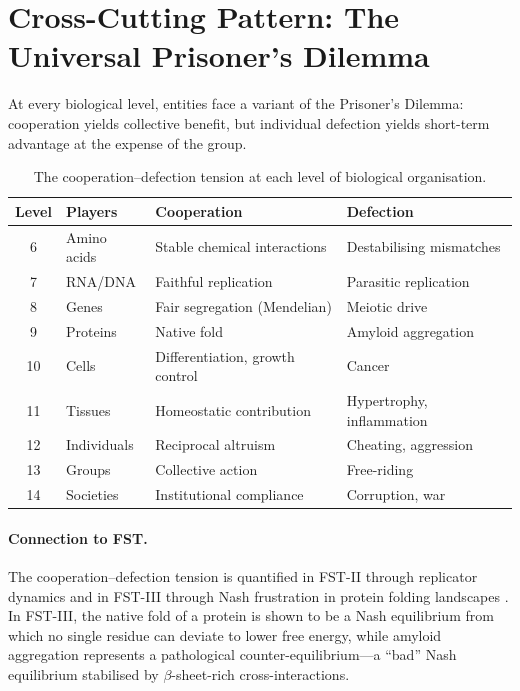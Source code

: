 \documentclass[12pt,a4paper]{article}
\theoremstyle{remark}
\begin{document}
\section{Cross-Cutting Pattern: The Universal Prisoner's Dilemma}
\label{sec:prisoners_dilemma}

At every biological level, entities face a variant of the Prisoner's Dilemma: cooperation yields collective benefit, but individual defection yields short-term advantage at the expense of the group.

\begin{table}[htbp]
  \centering
  \caption{The cooperation--defection tension at each level of biological organisation.}
  \label{tab:pd_levels}
  \begin{tabularx}{\textwidth}{c l X X}
    \toprule
    \textbf{Level} & \textbf{Players} & \textbf{Cooperation} & \textbf{Defection} \\
    \midrule
    6  & Amino acids  & Stable chemical interactions         & Destabilising mismatches \\
    7  & RNA/DNA      & Faithful replication                 & Parasitic replication \\
    8  & Genes        & Fair segregation (Mendelian)          & Meiotic drive \\
    9  & Proteins     & Native fold                          & Amyloid aggregation \\
    10 & Cells        & Differentiation, growth control      & Cancer \\
    11 & Tissues      & Homeostatic contribution             & Hypertrophy, inflammation \\
    12 & Individuals  & Reciprocal altruism                  & Cheating, aggression \\
    13 & Groups       & Collective action                    & Free-riding \\
    14 & Societies    & Institutional compliance             & Corruption, war \\
    \bottomrule
  \end{tabularx}
\end{table}

\paragraph{Connection to FST.}
The cooperation--defection tension is quantified in FST-II through replicator dynamics \citep{Geiger2026b} and in FST-III through Nash frustration in protein folding landscapes \citep{Geiger2026c}. In FST-III, the native fold of a protein is shown to be a Nash equilibrium from which no single residue can deviate to lower free energy, while amyloid aggregation represents a pathological counter-equilibrium---a ``bad'' Nash equilibrium stabilised by $\beta$-sheet-rich cross-interactions.
\end{document}
